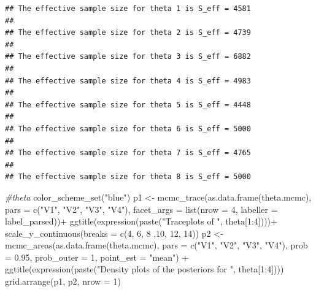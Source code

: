 \documentclass[
  11pt,
]{article}
\newenvironment{Shaded}{\begin{snugshade}}{\end{snugshade}}
\newcommand{\AttributeTok}[1]{\textcolor[rgb]{0.77,0.63,0.00}{#1}}
\newcommand{\CommentTok}[1]{\textcolor[rgb]{0.56,0.35,0.01}{\textit{#1}}}
\newcommand{\DecValTok}[1]{\textcolor[rgb]{0.00,0.00,0.81}{#1}}
\newcommand{\FloatTok}[1]{\textcolor[rgb]{0.00,0.00,0.81}{#1}}
\newcommand{\FunctionTok}[1]{\textcolor[rgb]{0.00,0.00,0.00}{#1}}
\newcommand{\NormalTok}[1]{#1}
\newcommand{\OtherTok}[1]{\textcolor[rgb]{0.56,0.35,0.01}{#1}}
\newcommand{\SpecialCharTok}[1]{\textcolor[rgb]{0.00,0.00,0.00}{#1}}
\newcommand{\StringTok}[1]{\textcolor[rgb]{0.31,0.60,0.02}{#1}}
\begin{document}
\begin{verbatim}
## The effective sample size for theta 1 is S_eff = 4581 
## 
## The effective sample size for theta 2 is S_eff = 4739 
## 
## The effective sample size for theta 3 is S_eff = 6882 
## 
## The effective sample size for theta 4 is S_eff = 4983 
## 
## The effective sample size for theta 5 is S_eff = 4448 
## 
## The effective sample size for theta 6 is S_eff = 5000 
## 
## The effective sample size for theta 7 is S_eff = 4765 
## 
## The effective sample size for theta 8 is S_eff = 5000
\end{verbatim}

\normalsize

\scriptsize

\begin{Shaded}
\begin{Highlighting}[]
\CommentTok{\#theta}
\FunctionTok{color\_scheme\_set}\NormalTok{(}\StringTok{"blue"}\NormalTok{)}
\NormalTok{p1 }\OtherTok{\textless{}{-}} \FunctionTok{mcmc\_trace}\NormalTok{(}\FunctionTok{as.data.frame}\NormalTok{(theta.mcmc), }\AttributeTok{pars =} \FunctionTok{c}\NormalTok{(}\StringTok{"V1"}\NormalTok{, }\StringTok{"V2"}\NormalTok{, }\StringTok{"V3"}\NormalTok{, }\StringTok{"V4"}\NormalTok{), }\AttributeTok{facet\_args =} \FunctionTok{list}\NormalTok{(}\AttributeTok{nrow =} \DecValTok{4}\NormalTok{, }\AttributeTok{labeller =}\NormalTok{ label\_parsed))}\SpecialCharTok{+}
  \FunctionTok{ggtitle}\NormalTok{(}\FunctionTok{expression}\NormalTok{(}\FunctionTok{paste}\NormalTok{(}\StringTok{"Traceplots of "}\NormalTok{, theta[}\DecValTok{1}\SpecialCharTok{:}\DecValTok{4}\NormalTok{])))}\SpecialCharTok{+}
  \FunctionTok{scale\_y\_continuous}\NormalTok{(}\AttributeTok{breaks =} \FunctionTok{c}\NormalTok{(}\DecValTok{4}\NormalTok{, }\DecValTok{6}\NormalTok{, }\DecValTok{8}\NormalTok{ ,}\DecValTok{10}\NormalTok{, }\DecValTok{12}\NormalTok{, }\DecValTok{14}\NormalTok{))}
\NormalTok{p2 }\OtherTok{\textless{}{-}} \FunctionTok{mcmc\_areas}\NormalTok{(}\FunctionTok{as.data.frame}\NormalTok{(theta.mcmc), }\AttributeTok{pars =} \FunctionTok{c}\NormalTok{(}\StringTok{"V1"}\NormalTok{, }\StringTok{"V2"}\NormalTok{, }\StringTok{"V3"}\NormalTok{, }\StringTok{"V4"}\NormalTok{), }\AttributeTok{prob =} \FloatTok{0.95}\NormalTok{, }
  \AttributeTok{prob\_outer =} \DecValTok{1}\NormalTok{, }
  \AttributeTok{point\_est =} \StringTok{"mean"}\NormalTok{) }\SpecialCharTok{+}
  \FunctionTok{ggtitle}\NormalTok{(}\FunctionTok{expression}\NormalTok{(}\FunctionTok{paste}\NormalTok{(}\StringTok{"Density plots of the posteriors for "}\NormalTok{, theta[}\DecValTok{1}\SpecialCharTok{:}\DecValTok{4}\NormalTok{])))}
\FunctionTok{grid.arrange}\NormalTok{(p1, p2, }\AttributeTok{nrow =} \DecValTok{1}\NormalTok{)}
\end{Highlighting}
\end{Shaded}
\end{document}

